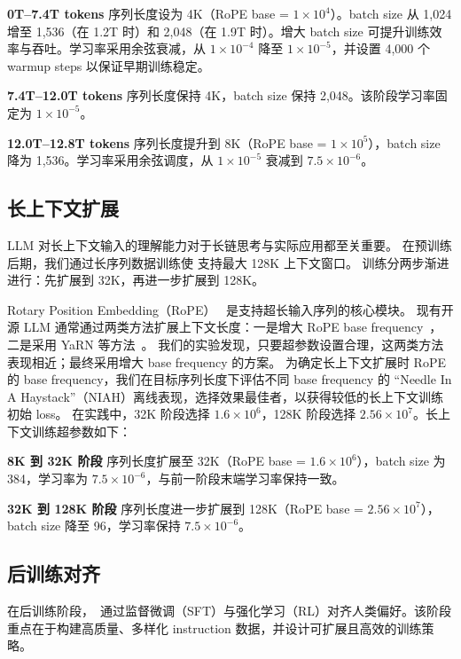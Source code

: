 \textbf{0T--7.4T tokens} 序列长度设为 4K（RoPE base = $1 \times 10^4$）。batch size 从 1,024 增至 1,536（在 1.2T 时）和 2,048（在 1.9T 时）。增大 batch size 可提升训练效率与吞吐。学习率采用余弦衰减，从 $1 \times 10^{-4}$ 降至 $1 \times 10^{-5}$，并设置 4,000 个 warmup steps 以保证早期训练稳定。



\textbf{7.4T--12.0T tokens} 序列长度保持 4K，batch size 保持 2,048。该阶段学习率固定为 $1 \times 10^{-5}$。

\textbf{12.0T--12.8T tokens} 序列长度提升到 8K（RoPE base = $1 \times 10^5$），batch size 降为 1,536。学习率采用余弦调度，从 $1 \times 10^{-5}$ 衰减到 $7.5 \times 10^{-6}$。




\subsection{长上下文扩展}
LLM 对长上下文输入的理解能力对于长链思考与实际应用都至关重要。
在预训练后期，我们通过长序列数据训练使 \modelname 支持最大 128K 上下文窗口。
训练分两步渐进进行：先扩展到 32K，再进一步扩展到 128K。


Rotary Position Embedding（RoPE）~\cite{su2023roformerenhancedtransformerrotary} 是支持超长输入序列的核心模块。
现有开源 LLM 通常通过两类方法扩展上下文长度：一是增大 RoPE base frequency~\cite{su2023roformerenhancedtransformerrotary,qwen-2.5-coder}，二是采用 YaRN 等方法~\cite{peng2023yarnefficientcontextwindow,dubey2024llama,deepseekv3}。
我们的实验发现，只要超参数设置合理，这两类方法表现相近；\modelname 最终采用增大 base frequency 的方案。
为确定长上下文扩展时 RoPE 的 base frequency，我们在目标序列长度下评估不同 base frequency 的 ``Needle In A Haystack''（NIAH）离线表现，选择效果最佳者，以获得较低的长上下文训练初始 loss。
在实践中，32K 阶段选择 $1.6\times 10^6$，128K 阶段选择 $2.56\times 10^{7}$。\modelname 长上下文训练超参数如下：

\textbf{8K 到 32K 阶段} 序列长度扩展至 32K（RoPE base = $1.6\times 10^6$），batch size 为 384，学习率为 $7.5\times 10^{-6}$，与前一阶段末端学习率保持一致。

\textbf{32K 到 128K 阶段} 序列长度进一步扩展到 128K（RoPE base = $2.56\times 10^{7}$），batch size 降至 96，学习率保持 $7.5\times 10^{-6}$。



\subsection{后训练对齐} 
在后训练阶段，\modelname~通过监督微调（SFT）与强化学习（RL）对齐人类偏好。该阶段重点在于构建高质量、多样化 instruction 数据，并设计可扩展且高效的训练策略。


